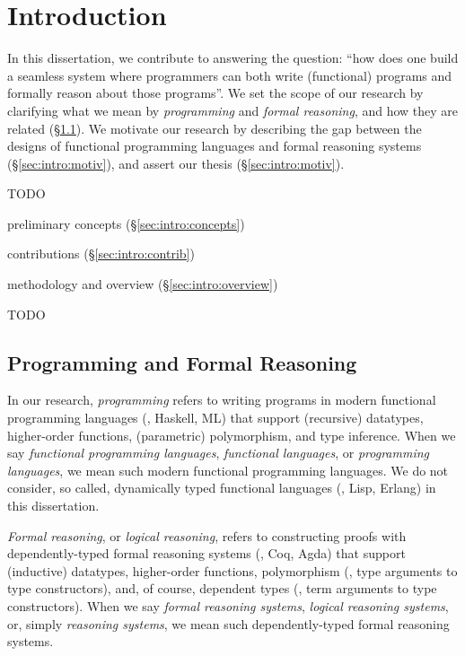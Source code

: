 \chapter{Introduction}\label{ch:intro}

In this dissertation, we contribute to answering the question:
``how does one build a seamless system where programmers can both
write (functional) programs and formally reason about those programs''.
We set the scope of our research by clarifying what we mean by
\emph{programming} and \emph{formal reasoning}, and how they are related
(\S\ref{sec:intro:scope}). We motivate our research by describing the gap
between the designs of functional programming languages and
formal reasoning systems (\S\ref{sec:intro:motiv}), and assert
our thesis (\S\ref{sec:intro:motiv}).

TODO

preliminary concepts (\S\ref{sec:intro:concepts})

contributions (\S\ref{sec:intro:contrib})

methodology and overview (\S\ref{sec:intro:overview})

TODO

\section{Programming and Formal Reasoning}\label{sec:intro:scope}

In our research, \emph{programming} refers to writing programs in
modern functional programming languages (\eg, Haskell, ML) that support
(recursive) datatypes, higher-order functions, (parametric) polymorphism,
and type inference. When we say \emph{functional programming languages},
\emph{functional languages}, or \emph{programming languages},
we mean such modern functional programming languages. We do not consider,
so called, dynamically typed functional languages (\eg, Lisp, Erlang)
in this dissertation.

\emph{Formal reasoning}, or \emph{logical reasoning},
refers to constructing proofs with dependently-typed formal reasoning systems
(\eg, Coq, Agda) that support (inductive) datatypes, higher-order functions,
polymorphism (\ie, type arguments to type constructors), and, of course,
dependent types (\ie, term arguments to type constructors). When we say
\emph{formal reasoning systems}, \emph{logical reasoning systems},
or, simply \emph{reasoning systems}, we mean such dependently-typed
formal reasoning systems.

